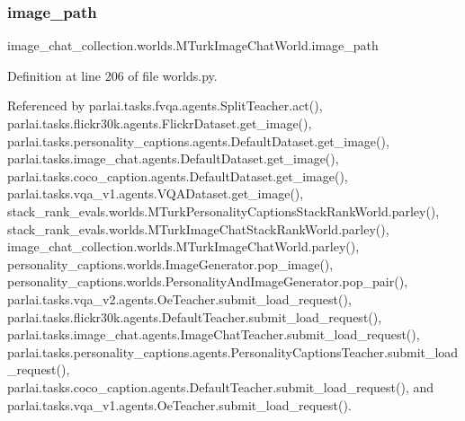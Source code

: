 \subsubsection{\texorpdfstring{image\+\_\+path}{image\_path}}
{\footnotesize\ttfamily image\+\_\+chat\+\_\+collection.\+worlds.\+M\+Turk\+Image\+Chat\+World.\+image\+\_\+path}



Definition at line 206 of file worlds.\+py.



Referenced by parlai.\+tasks.\+fvqa.\+agents.\+Split\+Teacher.\+act(), parlai.\+tasks.\+flickr30k.\+agents.\+Flickr\+Dataset.\+get\+\_\+image(), parlai.\+tasks.\+personality\+\_\+captions.\+agents.\+Default\+Dataset.\+get\+\_\+image(), parlai.\+tasks.\+image\+\_\+chat.\+agents.\+Default\+Dataset.\+get\+\_\+image(), parlai.\+tasks.\+coco\+\_\+caption.\+agents.\+Default\+Dataset.\+get\+\_\+image(), parlai.\+tasks.\+vqa\+\_\+v1.\+agents.\+V\+Q\+A\+Dataset.\+get\+\_\+image(), stack\+\_\+rank\+\_\+evals.\+worlds.\+M\+Turk\+Personality\+Captions\+Stack\+Rank\+World.\+parley(), stack\+\_\+rank\+\_\+evals.\+worlds.\+M\+Turk\+Image\+Chat\+Stack\+Rank\+World.\+parley(), image\+\_\+chat\+\_\+collection.\+worlds.\+M\+Turk\+Image\+Chat\+World.\+parley(), personality\+\_\+captions.\+worlds.\+Image\+Generator.\+pop\+\_\+image(), personality\+\_\+captions.\+worlds.\+Personality\+And\+Image\+Generator.\+pop\+\_\+pair(), parlai.\+tasks.\+vqa\+\_\+v2.\+agents.\+Oe\+Teacher.\+submit\+\_\+load\+\_\+request(), parlai.\+tasks.\+flickr30k.\+agents.\+Default\+Teacher.\+submit\+\_\+load\+\_\+request(), parlai.\+tasks.\+image\+\_\+chat.\+agents.\+Image\+Chat\+Teacher.\+submit\+\_\+load\+\_\+request(), parlai.\+tasks.\+personality\+\_\+captions.\+agents.\+Personality\+Captions\+Teacher.\+submit\+\_\+load\+\_\+request(), parlai.\+tasks.\+coco\+\_\+caption.\+agents.\+Default\+Teacher.\+submit\+\_\+load\+\_\+request(), and parlai.\+tasks.\+vqa\+\_\+v1.\+agents.\+Oe\+Teacher.\+submit\+\_\+load\+\_\+request().

\mbox{\label{classimage__chat__collection_1_1worlds_1_1MTurkImageChatWorld_aefe1eca5e9e0c0588cf3a938cbfc9bee}} 
